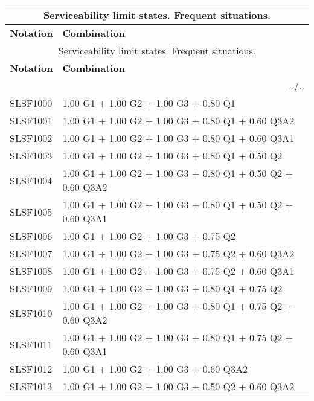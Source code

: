\begin{center}
\begin{small}
\begin{longtable}{|l|p{10cm}|}
\hline
\multicolumn{2}{|c|}{Serviceability limit states. Frequent situations.}\\
\hline
\textbf{Notation} & \textbf{Combination} \\
\hline
\endfirsthead
\hline
\multicolumn{2}{|c|}{Serviceability limit states. Frequent situations.}\\
\hline
\textbf{Notation} & \textbf{Combination} \\
\hline
\endhead
\hline \multicolumn{2}{|r|}{{../..}} \\ \hline
\endfoot
\hline
\endlastfoot
SLSF1000 & 1.00 G1 + 1.00 G2 + 1.00 G3 + 0.80 Q1\\
SLSF1001 & 1.00 G1 + 1.00 G2 + 1.00 G3 + 0.80 Q1 + 0.60 Q3A2\\
SLSF1002 & 1.00 G1 + 1.00 G2 + 1.00 G3 + 0.80 Q1 + 0.60 Q3A1\\
SLSF1003 & 1.00 G1 + 1.00 G2 + 1.00 G3 + 0.80 Q1 + 0.50 Q2\\
SLSF1004 & 1.00 G1 + 1.00 G2 + 1.00 G3 + 0.80 Q1 + 0.50 Q2 + 0.60 Q3A2\\
SLSF1005 & 1.00 G1 + 1.00 G2 + 1.00 G3 + 0.80 Q1 + 0.50 Q2 + 0.60 Q3A1\\
SLSF1006 & 1.00 G1 + 1.00 G2 + 1.00 G3 + 0.75 Q2\\
SLSF1007 & 1.00 G1 + 1.00 G2 + 1.00 G3 + 0.75 Q2 + 0.60 Q3A2\\
SLSF1008 & 1.00 G1 + 1.00 G2 + 1.00 G3 + 0.75 Q2 + 0.60 Q3A1\\
SLSF1009 & 1.00 G1 + 1.00 G2 + 1.00 G3 + 0.80 Q1 + 0.75 Q2\\
SLSF1010 & 1.00 G1 + 1.00 G2 + 1.00 G3 + 0.80 Q1 + 0.75 Q2 + 0.60 Q3A2\\
SLSF1011 & 1.00 G1 + 1.00 G2 + 1.00 G3 + 0.80 Q1 + 0.75 Q2 + 0.60 Q3A1\\
SLSF1012 & 1.00 G1 + 1.00 G2 + 1.00 G3 + 0.60 Q3A2\\
SLSF1013 & 1.00 G1 + 1.00 G2 + 1.00 G3 + 0.50 Q2 + 0.60 Q3A2\\
\hline
\end{longtable}
\end{small}
\end{center}

